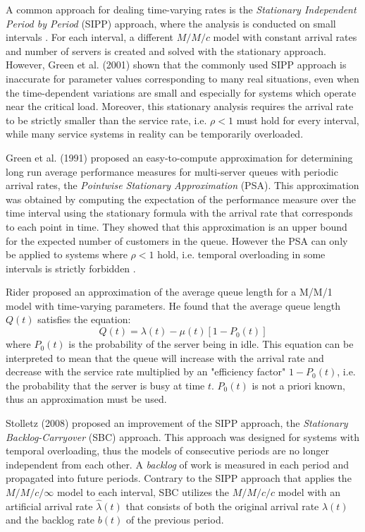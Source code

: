 A common approach for dealing time-varying rates is the \emph{Stationary Independent Period by Period} (SIPP) approach, where the analysis is conducted on small intervals \cite{stolletz}. For each interval, a different \( M/M/c \) model with constant arrival rates and number of servers is created and solved with the stationary approach.
However, Green et al. (2001) \cite{green2001} shown that the commonly used SIPP approach is inaccurate for parameter values corresponding to many real situations, even when the time-dependent variations are small and especially for systems which operate near the critical load. Moreover, this stationary analysis requires the arrival rate to be strictly smaller than the service rate, i.e. \( \rho < 1\) must hold for every interval, while many service systems in reality can be temporarily overloaded.

Green et al. (1991) \cite{green1991} proposed an easy-to-compute approximation for determining long run average performance measures for multi-server queues with periodic arrival rates, the \emph{Pointwise Stationary Approximation} (PSA). This approximation was obtained by computing the expectation of the performance measure over the time interval using the stationary formula with the arrival rate that corresponds to each point in time. They showed that this approximation is an upper bound for the expected number of customers in the queue. However the PSA can only be applied to systems where \( \rho < 1\) hold, i.e. temporal overloading in some intervals is strictly forbidden \cite{stolletz}.

Rider \cite{rider} proposed an approximation of the average queue length for a M/M/1 model with time-varying parameters. He found that the average queue length \( Q(t) \) satisfies the equation:
\[ Q(t) = \lambda(t) - \mu(t) [1 - P_0(t)] \]
where \( P_0(t) \) is the probability of the server being in idle. This equation can be interpreted to mean that the queue will increase with the arrival rate and decrease with the service rate multiplied by an "efficiency factor" \( 1 - P_0(t) \), i.e. the probability that the server is busy at time \( t \). \( P_0(t) \) is not a priori known, thus an approximation must be used. %

Stolletz (2008) \cite{stolletz} proposed an improvement of the SIPP approach, the \emph{Stationary Backlog-Carryover} (SBC) approach. This approach was designed for systems with temporal overloading, thus the models of consecutive periods are no longer independent from each other. A \emph{backlog} of work is measured in each period and propagated into future periods. Contrary to the SIPP approach that applies the \( M/M/c/\infty \) model to each interval, SBC utilizes the \( M/M/c/c \) model with an artificial arrival rate \( \hat{\lambda}(t) \) that consists of both the original arrival rate \( \lambda(t) \) and the backlog rate \( b(t) \) of the previous period.



\clearpage